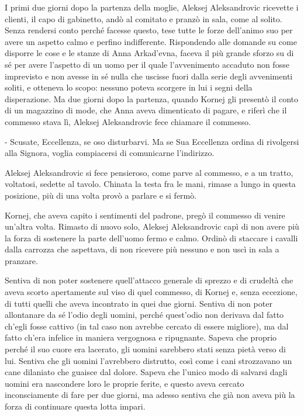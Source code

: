 I primi due giorni dopo la partenza della moglie, Aleksej Aleksandrovic ricevette i clienti, il capo di gabinetto, andò al comitato e pranzò in sala, come al solito. Senza rendersi conto perché facesse questo, tese tutte le forze dell'animo suo per avere un aspetto calmo e perfino indifferente. Rispondendo alle domande su come disporre le cose e le stanze di Anna Arkad'evna, faceva il più grande sforzo su di sé per avere l'aspetto di un uomo per il quale l'avvenimento accaduto non fosse imprevisto e non avesse in sé nulla che uscisse fuori dalla serie degli avvenimenti soliti, e otteneva lo scopo: nessuno poteva scorgere in lui i segni della disperazione. Ma due giorni dopo la partenza, quando Kornej gli presentò il conto di un magazzino di mode, che Anna aveva dimenticato di pagare, e riferì che il commesso stava lì, Aleksej Aleksandrovic fece chiamare il commesso. 

- Scusate, Eccellenza, se oso disturbarvi. Ma se Sua Eccellenza ordina di rivolgersi alla Signora, voglia compiacersi di comunicarne l'indirizzo. 

Aleksej Aleksandrovic si fece pensieroso, come parve al commesso, e a un tratto, voltatosi, sedette al tavolo. Chinata la testa fra le mani, rimase a lungo in questa posizione, più di una volta provò a parlare e si fermò. 

Kornej, che aveva capito i sentimenti del padrone, pregò il commesso di venire un'altra volta. Rimasto di nuovo solo, Aleksej Aleksandrovic capì di non avere più la forza di sostenere la parte dell'uomo fermo e calmo. Ordinò di staccare i cavalli dalla carrozza che aspettava, di non ricevere più nessuno e non uscì in sala a pranzare. 

Sentiva di non poter sostenere quell'attacco generale di sprezzo e di crudeltà che aveva scorto apertamente sul viso di quel commesso, di Kornej e, senza eccezione, di tutti quelli che aveva incontrato in quei due giorni. Sentiva di non poter allontanare da sé l'odio degli uomini, perché quest'odio non derivava dal fatto ch'egli fosse cattivo (in tal caso non avrebbe cercato di essere migliore), ma dal fatto ch'era infelice in maniera vergognosa e ripugnante. Sapeva che proprio perché il suo cuore era lacerato, gli uomini sarebbero stati senza pietà verso di lui. Sentiva che gli uomini l'avrebbero distrutto, così come i cani strozzavano un cane dilaniato che guaisce dal dolore. Sapeva che l'unico modo di salvarsi dagli uomini era nascondere loro le proprie ferite, e questo aveva cercato inconsciamente di fare per due giorni, ma adesso sentiva che già non aveva più la forza di continuare questa lotta impari. 

